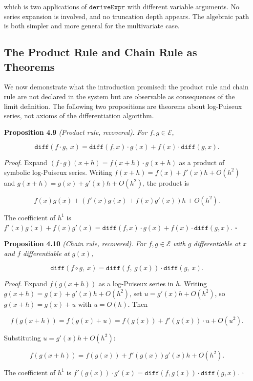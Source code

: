 \documentclass[12pt]{article}
\begin{document}
which is two applications of \(\mathtt{deriveExpr}\) with different
variable arguments. No series expansion is involved, and no truncation
depth appears. The algebraic path is both simpler and more general for
the multivariate case.




\subsection{The Product Rule and Chain Rule as
Theorems}\label{the-product-rule-and-chain-rule-as-theorems}

We now demonstrate what the introduction promised: the product rule and
chain rule are not declared in the system but are observable as
consequences of the limit definition. The following two propositions are
theorems about log-Puiseux series, not axioms of the differentiation
algorithm.

\textbf{Proposition 4.9} \emph{(Product rule, recovered).} \emph{For
\(f, g \in \mathcal{E}\),}

\[\mathtt{diff}(f \cdot g,\ x) = \mathtt{diff}(f, x) \cdot g(x) + f(x) \cdot \mathtt{diff}(g, x).\]

\emph{Proof.} Expand \((f \cdot g)(x+h) = f(x+h) \cdot g(x+h)\) as a
product of symbolic log-Puiseux series. Writing
\(f(x+h) = f(x) + f'(x)h + O(h^2)\) and
\(g(x+h) = g(x) + g'(x)h + O(h^2)\), the product is

\[f(x)g(x) + (f'(x)g(x) + f(x)g'(x))h + O(h^2).\]

The coefficient of \(h^1\) is
\(f'(x)g(x) + f(x)g'(x) = \mathtt{diff}(f,x) \cdot g(x) + f(x) \cdot \mathtt{diff}(g,x)\).
\(\square\)

\textbf{Proposition 4.10} \emph{(Chain rule, recovered).} \emph{For
\(f, g \in \mathcal{E}\) with \(g\) differentiable at \(x\) and \(f\)
differentiable at \(g(x)\),}

\[\mathtt{diff}(f \circ g,\ x) = \mathtt{diff}(f,\ g(x)) \cdot \mathtt{diff}(g,\ x).\]

\emph{Proof.} Expand \(f(g(x+h))\) as a log-Puiseux series in \(h\).
Writing \(g(x+h) = g(x) + g'(x)h + O(h^2)\), set
\(u = g'(x)h + O(h^2)\), so \(g(x+h) = g(x) + u\) with \(u = O(h)\).
Then

\[f(g(x+h)) = f(g(x) + u) = f(g(x)) + f'(g(x)) \cdot u + O(u^2).\]

Substituting \(u = g'(x)h + O(h^2)\):

\[f(g(x+h)) = f(g(x)) + f'(g(x)) g'(x) h + O(h^2).\]

The coefficient of \(h^1\) is
\(f'(g(x)) \cdot g'(x) = \mathtt{diff}(f, g(x)) \cdot \mathtt{diff}(g, x)\).
\(\square\)
\end{document}
